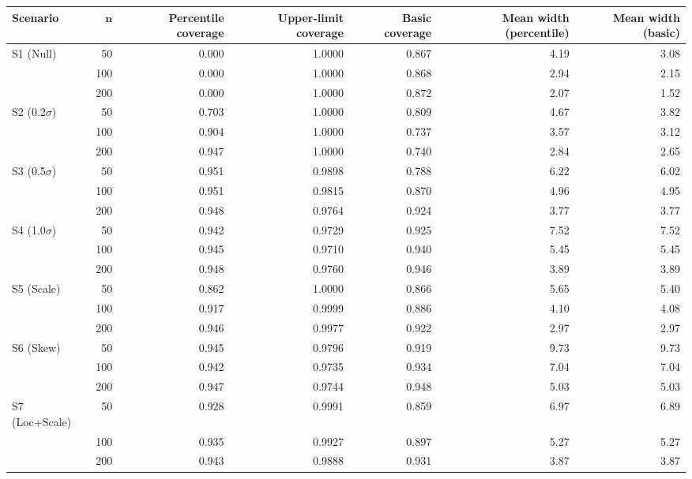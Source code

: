 {\footnotesize
\begin{tabular}{lrrrrrr}
\toprule
\textbf{Scenario} & $\boldsymbol{n}$ & \textbf{Percentile coverage} & \textbf{Upper-limit coverage} & \textbf{Basic coverage} & \textbf{Mean width (percentile)} & \textbf{Mean width (basic)} \\
\midrule
S1 (Null) & 50 & 0.000 & 1.0000 & 0.867 & 4.19 & 3.08 \\
 & 100 & 0.000 & 1.0000 & 0.868 & 2.94 & 2.15 \\
 & 200 & 0.000 & 1.0000 & 0.872 & 2.07 & 1.52 \\
\addlinespace
S2 (0.2$\sigma$) & 50 & 0.703 & 1.0000 & 0.809 & 4.67 & 3.82 \\
 & 100 & 0.904 & 1.0000 & 0.737 & 3.57 & 3.12 \\
 & 200 & 0.947 & 1.0000 & 0.740 & 2.84 & 2.65 \\
\addlinespace
S3 (0.5$\sigma$) & 50 & 0.951 & 0.9898 & 0.788 & 6.22 & 6.02 \\
 & 100 & 0.951 & 0.9815 & 0.870 & 4.96 & 4.95 \\
 & 200 & 0.948 & 0.9764 & 0.924 & 3.77 & 3.77 \\
\addlinespace
S4 (1.0$\sigma$) & 50 & 0.942 & 0.9729 & 0.925 & 7.52 & 7.52 \\
 & 100 & 0.945 & 0.9710 & 0.940 & 5.45 & 5.45 \\
 & 200 & 0.948 & 0.9760 & 0.946 & 3.89 & 3.89 \\
\addlinespace
S5 (Scale) & 50 & 0.862 & 1.0000 & 0.866 & 5.65 & 5.40 \\
 & 100 & 0.917 & 0.9999 & 0.886 & 4.10 & 4.08 \\
 & 200 & 0.946 & 0.9977 & 0.922 & 2.97 & 2.97 \\
\addlinespace
S6 (Skew) & 50 & 0.945 & 0.9796 & 0.919 & 9.73 & 9.73 \\
 & 100 & 0.942 & 0.9735 & 0.934 & 7.04 & 7.04 \\
 & 200 & 0.947 & 0.9744 & 0.948 & 5.03 & 5.03 \\
\addlinespace
S7 (Loc+Scale) & 50 & 0.928 & 0.9991 & 0.859 & 6.97 & 6.89 \\
 & 100 & 0.935 & 0.9927 & 0.897 & 5.27 & 5.27 \\
 & 200 & 0.943 & 0.9888 & 0.931 & 3.87 & 3.87 \\
\bottomrule
\end{tabular}
}
